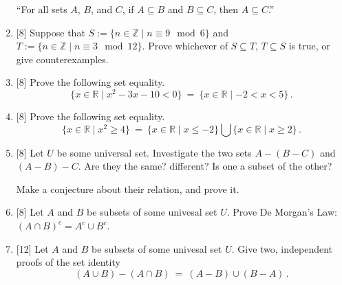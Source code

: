 \documentclass[12pt]{article}
\newcommand{\RR}{{\mathbb R}}
\newcommand{\ZZ}{{\mathbb Z}}
\begin{document}
\begin{enumerate}
  ``For all sets $A$, $B$, and $C$, if $A\subseteq B$ and $B\subseteq C$, then $A\subseteq C$.''

\item{[8]} Suppose that $S:=\{n\in\ZZ\mid n\equiv 9 \mod 6\}$ and $T:=\{n\in\ZZ\mid n\equiv 3 \mod 12\}$.
          Prove whichever of $S\subseteq T$, $T\subseteq S$ is true, or give counterexamples.

\item{[8]}  Prove the following set equality.
  \[
     \{ x\in\RR\mid x^2-3x-10<0\}\ =\ \{x\in\RR\mid -2<x<5\}\,.
  \]

\item{[8]}  Prove the following set equality.
  \[
     \{ x\in\RR\mid x^2\geq 4\}\ =\ \{x\in\RR\mid x\leq -2 \} \bigcup \{x\in\RR\mid x\geq 2\}\,.
  \]
 
\item{[8]} Let  $U$ be some universal set.
  Investigate the two sets $A-(B-C)$ and $(A-B)-C$.  Are they the same? different? Is one a subset of the other?

  Make a conjecture about their relation, and prove it.

\item{[8]}  Let $A$ and $B$ be subsets of some univesal set $U$.
           Prove De Morgan's Law: $(A\cap B)^c= A^c\cup B^c$.

 
\item{[12]}  Let $A$ and $B$ be subsets of some univesal set $U$.
  Give two, independent proofs of the set identity
  \[
  (A\cup B) - (A\cap B)\ =\ (A-B) \cup (B-A)\,.
  \]


\end{enumerate}
\end{document}
